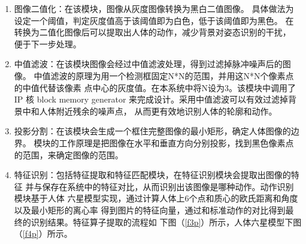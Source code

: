 \documentclass[UTF-8, a4paper, 12pt]{ctexart}
\begin{document}
\begin{enumerate}
    \item 图像二值化：在该模块，图像从灰度图像转换为黑白二值图像。
    具体做法为设定一个阈值，判定灰度值高于该阈值即为白色，低于该阈值即为黑色。
    在转换为二值化图像后可以提取出人体的动作，减少背景对姿态识别的干扰，
    便于下一步处理。
    \item 中值滤波：在该模块图像会经过中值滤波处理，得到过滤掉脉冲噪声后的图像。
    中值滤波的原理为用一个检测框固定N*N的范围，并用这N*N个像素点的中值代替该像素
    点中心的灰度值。在本系统中将N设为3。该模块中调用了IP 核 block memory generator
    来完成设计。采用中值滤波可以有效过滤掉背景中和人体附近残余的噪声点，
    从而更有效地识别人体的轮廓和动作。
    \item 投影分割：在该模块会生成一个框住完整图像的最小矩形，确定人体图像的边界。
    模块的工作原理是把图像在水平和垂直方向分别投影，找到黑色像素点的范围，来确定图像的范围。
    \item 特征识别：包括特征提取和特征匹配模块，在特征识别模块会提取出图像的特征
    并与保存在系统中的特征对比，从而识别出该图像是哪种动作。动作识别模块基于人体
    六星模型实现，通过计算人体上6个点和质心的欧氏距离和角度以及最小矩形的离心率
    得到图片的特征向量，通过和标准动作的对比得到最终的识别结果。特征算子提取的流程如
    下图（\ref{f3p}）所示，人体六星模型下图（\ref{f4p}）所示。


\end{enumerate}
\end{document}
